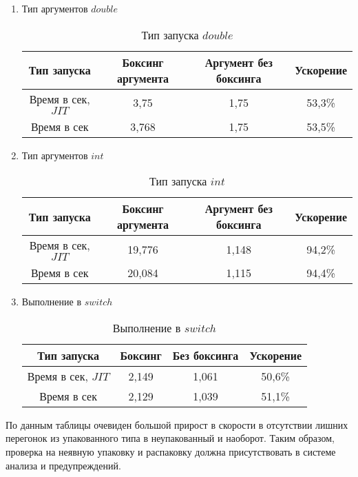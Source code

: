\documentclass{mipt-thesis-bs}
\begin{document}
\begin{enumerate}
    \item Тип аргументов $double$
\begin{table}[h]
    \centering
    \begin{tabular}{|c|c|c|c|}
      \hline
      Тип запуска & Боксинг аргумента & Аргумент без боксинга & Ускорение \\
      \hline
      Время в сек, $JIT$ & 3,75 & 1,75 & 53,3\% \\
      \hline
      Время в сек & 3,768 & 1,75 & 53,5\% \\
      \hline
    \end{tabular}
    \caption{Тип запуска $double$}
  \end{table}

  \item Тип аргументов $int$

\begin{table}[h]
    \centering
    \begin{tabular}{|c|c|c|c|}
      \hline
      Тип запуска & Боксинг аргумента & Аргумент без боксинга & Ускорение \\
      \hline
      Время в сек, $JIT$ & 19,776 & 1,148 & 94,2\% \\
      \hline
      Время в сек & 20,084 & 1,115 & 94,4\% \\
      \hline
    \end{tabular}
    \caption{Тип запуска $int$}
  \end{table}

  \item Выполнение в $switch$
  \begin{table}[h]
    \centering
    \begin{tabular}{|c|c|c|c|}
      \hline
      Тип запуска & Боксинг & Без боксинга & Ускорение \\
      \hline
      Время в сек, $JIT$ & 2,149 & 1,061 & 50,6\% \\
      \hline
      Время в сек & 2,129 & 1,039 & 51,1\% \\
      \hline
    \end{tabular}
    \caption{Выполнение в $switch$}
  \end{table}
\end{enumerate}

По данным таблицы очевиден большой прирост в скорости в отсутствии
лишних перегонок из упакованного типа в неупакованный и наоборот.
Таким образом, проверка на неявную упаковку и распаковку должна
присутствовать в системе анализа и предупреждений.
\end{document}
